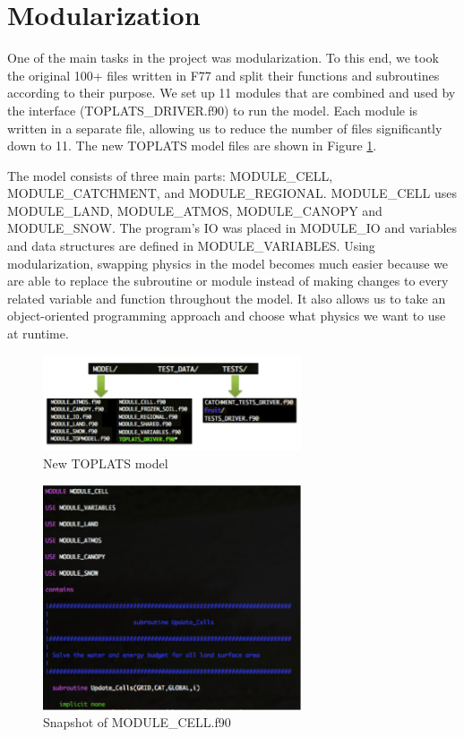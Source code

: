 \documentclass[pdftex,12pt,a4paper]{article}
\begin{document}
\section{Modularization}
One of the main tasks in the project was modularization. To this end, we took the original 100+ files written in F77 and split their functions and subroutines according to their purpose.  We set up 11 modules that are combined and used by the interface (TOPLATS\_DRIVER.f90) to run the model. Each module is written in a separate file, allowing us to reduce the number of files significantly down to 11.  The new TOPLATS model files are shown in Figure \ref{Modules1}. 

The model consists of three main parts: MODULE\_CELL,  MODULE\_CATCHMENT, and MODULE\_REGIONAL. MODULE\_CELL uses MODULE\_LAND, MODULE\_ATMOS, MODULE\_CANOPY and MODULE\_SNOW. The program's IO was placed in MODULE\_IO and variables and data structures are defined in MODULE\_VARIABLES. Using modularization, swapping physics in the model becomes much easier because we are able to replace the subroutine or module instead of making changes to every related variable and function throughout the model. It also allows us to take an object-oriented programming approach and choose what physics we want to use at runtime.

\begin{figure}[h]
	\centering
	\includegraphics[width=3.0in]{Figures/Modules1.png}
	\caption{New TOPLATS model}
	\label{Modules1}
\end{figure}

\begin{figure}[h]
	\centering
	\includegraphics[width=3.0in]{Figures/Modules2.png}
	\caption{Snapshot of MODULE\_CELL.f90}
	\label{Modules2}
\end{figure}
\end{document}
